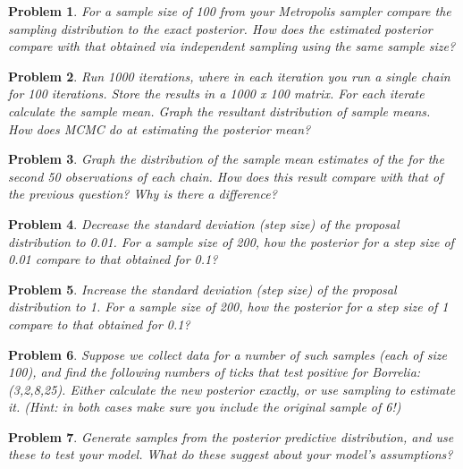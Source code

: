\documentclass{article}
\newtheorem{problem}{Problem}[section]
\begin{document}
\begin{problem}
For a sample size of 100 from your Metropolis sampler compare the sampling distribution to the exact posterior. How does the estimated posterior compare with that obtained via independent sampling using the same sample size?
\end{problem}

\begin{problem}
Run 1000 iterations, where in each iteration you run a single chain for 100 iterations. Store the results in a 1000 x 100 matrix. For each iterate calculate the sample mean. Graph the resultant distribution of sample means. How does MCMC do at estimating the posterior mean?
\end{problem}

\begin{problem}
Graph the distribution of the sample mean estimates of the  for the second 50 observations of each chain. How does this result compare with that of the previous question? Why is there a difference?
\end{problem}

\begin{problem}
Decrease the standard deviation (step size) of the proposal distribution to 0.01. For a sample size of 200, how the posterior for a step size of 0.01 compare to that obtained for 0.1?
\end{problem}

\begin{problem}
Increase the standard deviation (step size) of the proposal distribution to 1. For a sample size of 200, how the posterior for a step size of 1 compare to that obtained for 0.1?
\end{problem}

\begin{problem}
Suppose we collect data for a number of such samples (each of size 100), and find the following numbers of ticks that test positive for \textit{Borrelia}: (3,2,8,25). Either calculate the new posterior exactly, or use sampling to estimate it. (Hint: in both cases make sure you include the original sample of 6!)
\end{problem}

\begin{problem}
Generate samples from the posterior predictive distribution, and use these to test your model. What do these suggest about your model's assumptions?
\end{problem}
\end{document}
